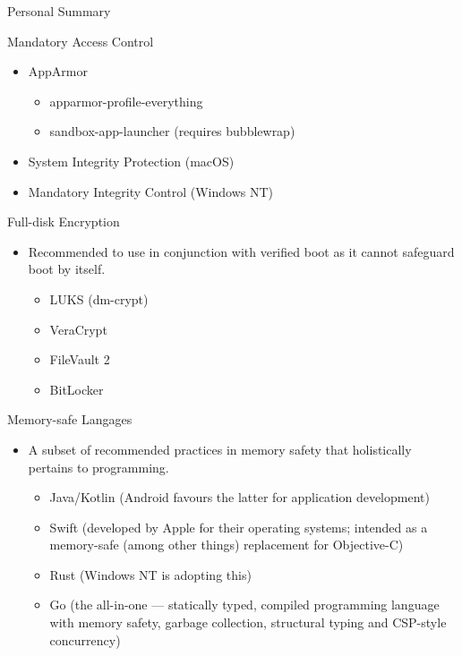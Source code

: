 \documentclass[]{mcdowellcv}
\begin{document}
\begin{cvsection}{Personal Summary}
\begin{cvsubsection}{Mandatory Access Control}{}{}
\begin{itemize}
\begin{itemize}
\begin{itemize}
						\item Chromium OS
					\end{itemize}
					\item AppArmor
					\begin{itemize}
						\item apparmor-profile-everything
						\item sandbox-app-launcher (requires bubblewrap)
					\end{itemize}
					\item System Integrity Protection (macOS)
					\item Mandatory Integrity Control (Windows NT)
				\end{itemize}
			\end{itemize}
		\end{cvsubsection}
		\begin{cvsubsection}{Full-disk Encryption}{}{}
			\begin{itemize}
				\item Recommended to use in conjunction with verified boot as it cannot safeguard boot by itself.
				\begin{itemize}
					\item LUKS (dm-crypt)
					\item VeraCrypt
					\item FileVault 2
					\item BitLocker
				\end{itemize}
			\end{itemize}
		\end{cvsubsection}
		\begin{cvsubsection}{Memory-safe Langages}{}{}
			\begin{itemize}
				\item A subset of recommended practices in memory safety that holistically pertains to programming.
				\begin{itemize}
					\item Java/Kotlin (Android favours the latter for application development)
					\item Swift (developed by Apple for their operating systems; intended as a memory-safe (among other things) replacement for Objective-C)
					\item Rust (Windows NT is adopting this)
					\item Go (the all-in-one — statically typed, compiled programming language with memory safety, garbage collection, structural typing and CSP-style concurrency)
				\end{itemize}

\end{itemize}
\end{cvsubsection}
\end{cvsection}
\end{document}
